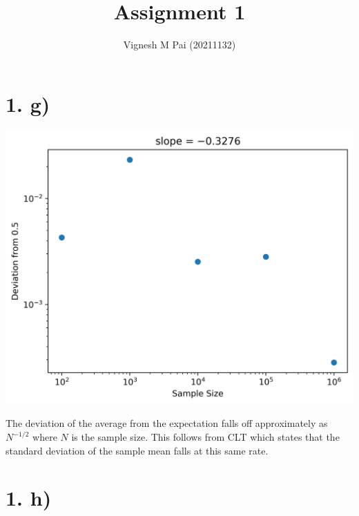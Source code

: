 \documentclass{article}
\title{Assignment 1}
\author{Vignesh M Pai (20211132)}
\date{}
\begin{document}
\maketitle

\section*{1. g)}

\begin{center}
    \includegraphics[scale=0.7]{1g.png}    
\end{center}

The deviation of the average from the expectation falls off approximately as $N^{-1/2}$ where $N$ is the sample size.
This follows from CLT which states that the standard deviation of the sample mean falls at this same rate.

\section*{1. h)}
\end{document}
